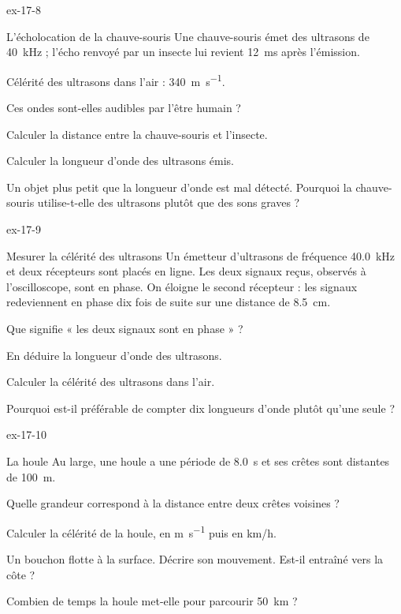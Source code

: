 \begin{blocLivre}{ex-17-8}
\begin{exercice}[2]{L'écholocation de la chauve-souris}
Une chauve-souris émet des ultrasons de \qty{40}{kHz} ; l'écho renvoyé par un insecte lui revient \qty{12}{ms} après l'émission.
\begin{donnees}
Célérité des ultrasons dans l'air : \qty{340}{m.s^{-1}}.
\end{donnees}
\begin{questions}
\item Ces ondes sont-elles audibles par l'être humain ?
\item Calculer la distance entre la chauve-souris et l'insecte.
\item Calculer la longueur d'onde des ultrasons émis.
\item Un objet plus petit que la longueur d'onde est mal détecté. Pourquoi la chauve-souris utilise-t-elle des ultrasons plutôt que des sons graves ?
\end{questions}
\end{exercice}
\end{blocLivre}
\begin{blocLivre}{ex-17-9}
\begin{exercice}[2]{Mesurer la célérité des ultrasons}
Un émetteur d'ultrasons de fréquence \qty{40,0}{kHz} et deux récepteurs sont placés en ligne. Les deux signaux reçus, observés à
l'oscilloscope, sont en phase. On éloigne le second récepteur : les signaux redeviennent en phase dix fois de suite sur une
distance de \qty{8,5}{cm}.
\begin{questions}
\item Que signifie « les deux signaux sont en phase » ?
\item En déduire la longueur d'onde des ultrasons.
\item Calculer la célérité des ultrasons dans l'air.
\item Pourquoi est-il préférable de compter dix longueurs d'onde plutôt qu'une seule ?
\end{questions}
\end{exercice}
\end{blocLivre}
\begin{blocLivre}{ex-17-10}
\begin{exercice}[2]{La houle}
Au large, une houle a une période de \qty{8,0}{s} et ses crêtes sont distantes de \qty{100}{m}.
\begin{questions}
\item Quelle grandeur correspond à la distance entre deux crêtes voisines ?
\item Calculer la célérité de la houle, en \unit{m.s^{-1}} puis en \unit{km/h}.
\item Un bouchon flotte à la surface. Décrire son mouvement. Est-il entraîné vers la côte ?
\item Combien de temps la houle met-elle pour parcourir \qty{50}{km} ?
\end{questions}
\end{exercice}
\end{blocLivre}
